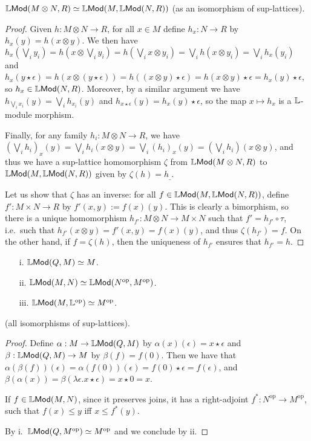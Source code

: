 \begin{proposition}
$\mathbb{L}\mathsf{Mod}(M\otimes N, R)   \simeq   \mathbb{L}\mathsf{Mod}(M, \mathbb{L}\mathsf{Mod}(N,R))$ (as an isomorphism of sup-lattices).
\end{proposition}
\begin{proof}
Given $h:M\otimes N\to R$, for all $x\in M$ define $h_{x}:N\to R$ by 
$h_{x}(y)=h(x\otimes y)$. We then have 
$h_{x}(\bigvee_{i}y_{i})=h(x\otimes \bigvee_{i}y_{i})=
h(\bigvee_{i}x\otimes  y_{i})=
\bigvee_{i}h(x\otimes  y_{i})=\bigvee_{i}h_{x}(y_{i})$ and 
$h_{x}(y\star\epsilon)= h(x\otimes (y\star \epsilon))=h((x\otimes y)\star\epsilon)=h(x\otimes y)\star \epsilon= h_{x}(y)\star\epsilon$, so $h_{x}\in \mathbb{L}\mathsf{Mod}(N,R)$. Moreover, by a similar argument we have  $h_{\bigvee_{i}x_{i}}(y)=\bigvee_{i}h_{x_{i}}(y)$
and $h_{x\star\epsilon}(y)=h_{x}(y)\star\epsilon$, so the map $x\mapsto h_{x}$ is a $\mathbb{L}$-module morphism. 

Finally, for any family $h_{i}:M\otimes N\to R$, we have 
$(\bigvee_{i}h_{i})_{x}(y)=\bigvee_{i}h_{i}(x\otimes y)=\bigvee_{i}(h_{i})_{x}(y)=(\bigvee_{i}h_{i})(x\otimes y)$, and thus we have a sup-lattice homomorphism $\zeta$ from $\mathbb{L}\mathsf{Mod}(M\otimes N,R)$ to $\mathbb{L}\mathsf{Mod}(M,\mathbb{L}\mathsf{Mod}(N,R))$ given by $\zeta(h)=h_{\_}$.

Let us show that $\zeta$ has an inverse:  for all $f\in \mathbb{L}\mathsf{Mod}(M,\mathbb{L}\mathsf{Mod}(N,R))$, define $f': M\times N\to R$ by $f'(x,y):=f(x)(y)$. This is clearly a bimorphism, so there is a unique homomorphism $h_{f'}:M\otimes N\to M\times N$ such that $f'=h_{f'}\circ \tau$, i.e.~such that 
$h_{f'}(x\otimes y)=f'(x,y)=f(x)(y)$, and thus $\zeta(h_{f'})=f$.
On the other hand, if $f=\zeta(h)$, then the uniqueness of $h_{f'}$ ensures that $h_{f'}=h$.
\end{proof}





\begin{proposition}
\begin{itemize}
\item[i.] $\mathbb{L}\mathsf{Mod}(Q,M)\simeq M$.
\item[ii.] $\mathbb{L}\mathsf{Mod}(M,N)\simeq \mathbb{L}\mathsf{Mod}(N^{\mathrm{op}},M^{\mathrm{op}})$.
\item[iii.] $\mathbb{L}\mathsf{Mod}(M, \mathbb{L}^{\mathrm{op}})\simeq M^{\mathrm{op}}$.
\end{itemize}
(all isomorphisms of sup-lattices).
\end{proposition}
\begin{proof}
Define $\alpha:M\to \mathbb{L}\mathsf{Mod}(Q,M)$ by $\alpha(x)(\epsilon)=x\star\epsilon$ and 
$\beta:\mathbb{L}\mathsf{Mod}(Q,M)\to M$ by $\beta(f)=f(0)$. Then we have that 
$\alpha(\beta(f))(\epsilon)=\alpha(f(0))(\epsilon)=f(0)\star\epsilon=f(\epsilon)$, and 
$\beta(\alpha(x))=\beta(\lambda \epsilon.x\star\epsilon)=x\star0=x$.

If $f\in \mathbb{L}\mathsf{Mod}(M,N)$, since it preserves joins, it has a right-adjoint $f^{*}:N^{\mathrm{op}}\to M^{\mathrm{op}}$, such that $f(x)\leq y$ iff $x\leq f^{*}(y)$. 


By i.~$\mathbb{L}\mathsf{Mod}(Q,M^{\mathrm{op}})\simeq M^{\mathrm{op}}$ and we conclude by ii.
\end{proof}

